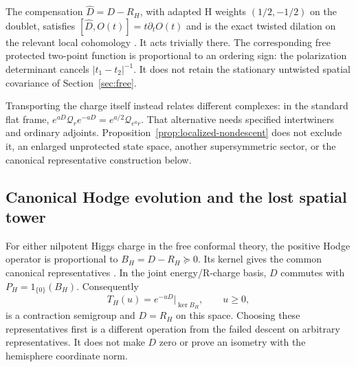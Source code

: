 The compensation $\widehat D=D-R_H$, with adapted H weights
$(1/2,-1/2)$ on the doublet, satisfies
$[\widehat D,O(t)]=t\partial_tO(t)$ and is the exact twisted
dilation on the relevant local cohomology
\cite[equation~(3.4)]{DPYHiggs}. It acts trivially there.
The corresponding free protected two-point function is proportional
to an ordering sign: the polarization determinant cancels
$|t_1-t_2|^{-1}$. It does not retain the stationary untwisted
spatial covariance of Section~\ref{sec:free}.

Transporting the charge itself instead relates different complexes:
in the standard flat frame,
$e^{aD}\mathcal Q_r e^{-aD}=e^{a/2}\mathcal Q_{e^ar}$.
That alternative needs specified intertwiners and ordinary adjoints.
Proposition~\ref{prop:localized-nondescent} does not exclude it,
an enlarged unprotected state space, another supersymmetric sector,
or the canonical representative construction below.

\subsection{Canonical Hodge evolution and the lost spatial tower}
\label{subsec:localized-hodge}

For either nilpotent Higgs charge in the free conformal theory,
the positive Hodge operator is proportional to
$B_H=D-R_H\succeq0$. Its kernel gives the common canonical
representatives \cite[equation~(3.4)]{DPYHiggs}. In the joint
energy/R-charge basis, $D$ commutes with
$P_H=1_{\{0\}}(B_H)$. Consequently
\begin{equation}\label{eq:localized-hodge-flow}
 T_H(u)=e^{-uD}|_{\ker B_H},\qquad u\geq0,
\end{equation}
is a contraction semigroup and $D=R_H$ on this space.
Choosing these representatives first is a different operation from
the failed descent on arbitrary representatives. It does not make
$D$ zero or prove an isometry with the hemisphere coordinate norm.

